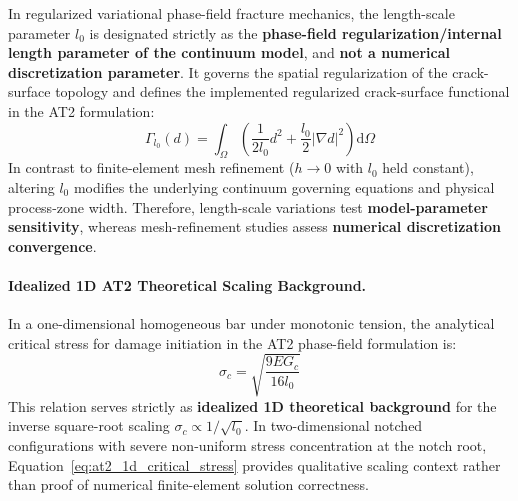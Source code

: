In regularized variational phase-field fracture mechanics, the length-scale parameter $l_0$ is designated strictly as the \textbf{phase-field regularization/internal length parameter of the continuum model}, and \textbf{not a numerical discretization parameter}. It governs the spatial regularization of the crack-surface topology and defines the implemented regularized crack-surface functional in the AT2 formulation:
\begin{equation}
  \Gamma_{l_0}(d) = \int_\Omega \left( \frac{1}{2 l_0} d^2 + \frac{l_0}{2} |\nabla d|^2 \right) \mathrm{d}\Omega
  \label{eq:bourdin_gamma_functional_l0}
\end{equation}
In contrast to finite-element mesh refinement ($h \to 0$ with $l_0$ held constant), altering $l_0$ modifies the underlying continuum governing equations and physical process-zone width. Therefore, length-scale variations test \textbf{model-parameter sensitivity}, whereas mesh-refinement studies assess \textbf{numerical discretization convergence}.

\paragraph{Idealized 1D AT2 Theoretical Scaling Background.}
In a one-dimensional homogeneous bar under monotonic tension, the analytical critical stress for damage initiation in the AT2 phase-field formulation is:
\begin{equation}
  \sigma_c = \sqrt{\frac{9 E G_c}{16 l_0}}
  \label{eq:at2_1d_critical_stress}
\end{equation}
This relation serves strictly as \textbf{idealized 1D theoretical background} for the inverse square-root scaling $\sigma_c \propto 1/\sqrt{l_0}$. In two-dimensional notched configurations with severe non-uniform stress concentration at the notch root, Equation~\eqref{eq:at2_1d_critical_stress} provides qualitative scaling context rather than proof of numerical finite-element solution correctness.

